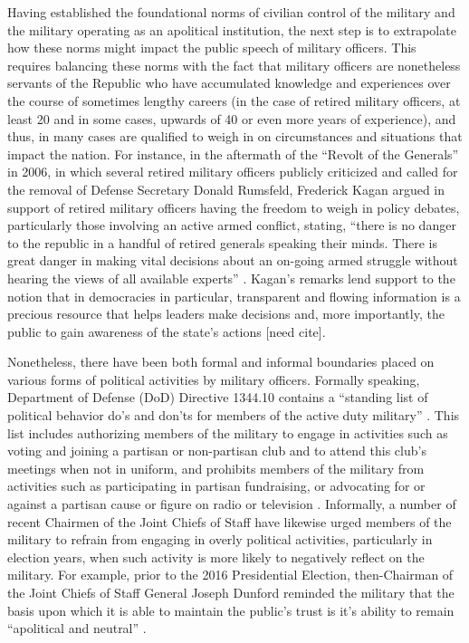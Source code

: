 \documentclass[12pt,]{article}
\begin{document}
Having established the foundational norms of civilian control of the military and the military operating as an apolitical institution, the next step is to extrapolate how these norms might impact the public speech of military officers. This requires balancing these norms with the fact that military officers are nonetheless servants of the Republic who have accumulated knowledge and experiences over the course of sometimes lengthy careers (in the case of retired military officers, at least 20 and in some cases, upwards of 40 or even more years of experience), and thus, in many cases are qualified to weigh in on circumstances and situations that impact the nation. For instance, in the aftermath of the ``Revolt of the Generals'' in 2006, in which several retired military officers publicly criticized and called for the removal of Defense Secretary Donald Rumsfeld, Frederick Kagan argued in support of retired military officers having the freedom to weigh in policy debates, particularly those involving an active armed conflict, stating, ``there is no danger to the republic in a handful of retired generals speaking their minds. There is great danger in making vital decisions about an on-going armed struggle without hearing the views of all available experts'' \autocite{kagan_let_2006}. Kagan's remarks lend support to the notion that in democracies in particular, transparent and flowing information is a precious resource that helps leaders make decisions and, more importantly, the public to gain awareness of the state's actions {[}need cite{]}.

Nonetheless, there have been both formal and informal boundaries placed on various forms of political activities by military officers. Formally speaking, Department of Defense (DoD) Directive 1344.10 contains a ``standing list of political behavior do's and don'ts for members of the active duty military'' \autocite[1]{urben_wearing_2014}. This list includes authorizing members of the military to engage in activities such as voting and joining a partisan or non-partisan club and to attend this club's meetings when not in uniform, and prohibits members of the military from activities such as participating in partisan fundraising, or advocating for or against a partisan cause or figure on radio or television \autocite{department_of_defense_political_2008}. Informally, a number of recent Chairmen of the Joint Chiefs of Staff have likewise urged members of the military to refrain from engaging in overly political activities, particularly in election years, when such activity is more likely to negatively reflect on the military. For example, prior to the 2016 Presidential Election, then-Chairman of the Joint Chiefs of Staff General Joseph Dunford reminded the military that the basis upon which it is able to maintain the public's trust is it's ability to remain ``apolitical and neutral'' \autocite{dunford_upholding_2016}.
\end{document}
